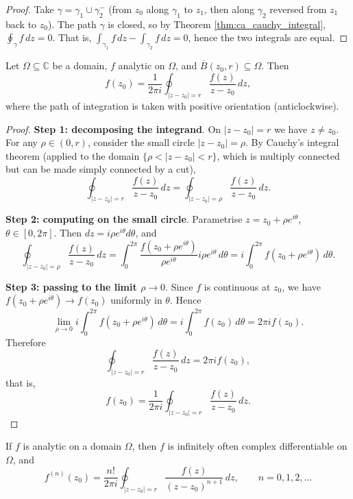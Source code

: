 \begin{proof}
Take $\gamma = \gamma_1 \cup \gamma_2^-$ (from $z_0$ along $\gamma_1$ to $z_1$, then along $\gamma_2$ reversed from $z_1$ back to $z_0$). The path $\gamma$ is closed, so by Theorem \ref{thm:ca_cauchy_integral}, $\oint_\gamma f \, dz = 0$. That is, $\int_{\gamma_1} f \, dz - \int_{\gamma_2} f \, dz = 0$, hence the two integrals are equal.
\end{proof}

\begin{theorem}\label{thm:ca_cauchy_formula}
Let $\Omega \subseteq \mathbb{C}$ be a domain, $f$ analytic on $\Omega$, and $\overline{B}(z_0, r) \subseteq \Omega$. Then
\[
f(z_0) = \frac{1}{2\pi i} \oint_{|z - z_0| = r} \frac{f(z)}{z - z_0} \, dz,
\]
where the path of integration is taken with positive orientation (anticlockwise).
\end{theorem}

\begin{proof}
\textbf{Step 1: decomposing the integrand}. On $|z - z_0| = r$ we have $z \neq z_0$. For any $\rho \in (0, r)$, consider the small circle $|z - z_0| = \rho$. By Cauchy's integral theorem (applied to the domain $\{\rho < |z - z_0| < r\}$, which is multiply connected but can be made simply connected by a cut),
\[
\oint_{|z - z_0| = r} \frac{f(z)}{z - z_0} \, dz = \oint_{|z - z_0| = \rho} \frac{f(z)}{z - z_0} \, dz.
\]

\textbf{Step 2: computing on the small circle}. Parametrise $z = z_0 + \rho e^{i\theta}$, $\theta \in [0, 2\pi]$. Then $dz = i\rho e^{i\theta} d\theta$, and
\[
\oint_{|z - z_0| = \rho} \frac{f(z)}{z - z_0} \, dz = \int_0^{2\pi} \frac{f(z_0 + \rho e^{i\theta})}{\rho e^{i\theta}} i\rho e^{i\theta} \, d\theta = i \int_0^{2\pi} f(z_0 + \rho e^{i\theta}) \, d\theta.
\]

\textbf{Step 3: passing to the limit $\rho \to 0$}. Since $f$ is continuous at $z_0$, we have $f(z_0 + \rho e^{i\theta}) \to f(z_0)$ uniformly in $\theta$. Hence
\[
\lim_{\rho \to 0} i \int_0^{2\pi} f(z_0 + \rho e^{i\theta}) \, d\theta = i \int_0^{2\pi} f(z_0) \, d\theta = 2\pi i f(z_0).
\]
Therefore\[\oint_{|z-z_0|=r}\frac{f(z)}{z-z_0}\,dz=2\pi i f(z_0),\]that is,\[f(z_0)=\frac{1}{2\pi i}\oint_{|z-z_0|=r}\frac{f(z)}{z-z_0}\,dz.\]
\end{proof}

\begin{corollary}\label{cor:ca_infinite_differentiable}
If $f$ is analytic on a domain $\Omega$, then $f$ is infinitely often complex differentiable on $\Omega$, and
\[
f^{(n)}(z_0) = \frac{n!}{2\pi i} \oint_{|z - z_0| = r} \frac{f(z)}{(z - z_0)^{n+1}} \, dz, \qquad n = 0, 1, 2, \dots
\]
\end{corollary}

